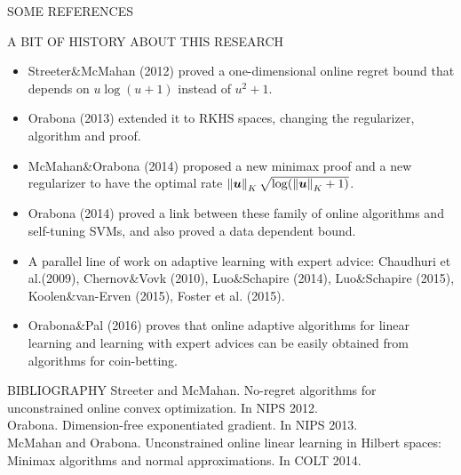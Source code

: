 \documentclass[final,t,serif,mathserif]{beamer}
\def\spazioo{\vspace{-0.3cm}}
\begin{document}
\begin{frame}{}
\begin{columns}[t]
\begin{column}{.33\linewidth}
    
    \begin{block}{SOME REFERENCES}
    \begin{minipage}{.98\linewidth}
    \begin{block}{A BIT OF HISTORY ABOUT THIS RESEARCH}
    \spazioo
    \begin{itemize}
    \item Streeter\&McMahan (2012) proved a one-dimensional online regret bound that depends on $u \log(u+1)$ instead of $u^2+1$.
    \item Orabona (2013) extended it to RKHS spaces, changing the regularizer, algorithm and proof.
    \item McMahan\&Orabona (2014) proposed a new minimax proof and a new regularizer to have the optimal rate $\left\|{\boldsymbol{u}}\right\|_K \sqrt{\log(\left\|{\boldsymbol{u}}\right\|_K+1)}$.
    \item Orabona (2014) proved a link between these family of online algorithms and self-tuning SVMs, and also proved a
    data dependent bound.
    \item A parallel line of work on adaptive learning with expert advice: Chaudhuri et al.(2009), Chernov\&Vovk (2010), Luo\&Schapire (2014), Luo\&Schapire (2015), Koolen\&van-Erven (2015), Foster et al. (2015).
    \item Orabona\&Pal (2016) proves that online adaptive algorithms for linear learning and learning with expert advices can be easily obtained from algorithms for coin-betting.
    \end{itemize}
    \spazioo
    \end{block}
    
   

    \begin{block}{BIBLIOGRAPHY}
    \spazioo
    \tiny
    Streeter and McMahan. No-regret algorithms for unconstrained online convex optimization. In NIPS 2012.\\
    Orabona. Dimension-free exponentiated gradient. In NIPS 2013.\\
    McMahan and Orabona. Unconstrained online linear learning in Hilbert spaces: Minimax algorithms and normal approximations. In COLT 2014.
    \spazioo
    \end{block}
    \end{minipage}
    \end{block}
    


\end{column}
\end{columns}
\end{frame}
\end{document}
